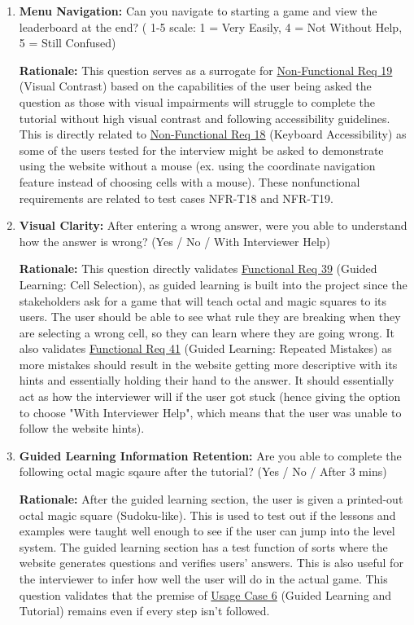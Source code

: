 \documentclass[12pt, titlepage]{article}
\begin{document}
\begin{enumerate}
    \item \textbf{Menu Navigation:} Can you navigate to starting a game and view the leaderboard at the end? ( 1-5 scale: 1 = Very Easily, 4 = Not Without Help, 5 = Still Confused)
    
    \textbf{Rationale:} This question serves as a surrogate for
    \hyperref[NFR_19]{Non-Functional Req  19} (Visual Contrast) based on the capabilities of the user being asked the question as those with visual impairments will struggle to complete
    the tutorial without high visual contrast and following accessibility guidelines. This is directly related to \hyperref[NFR_18]{Non-Functional Req  18} (Keyboard Accessibility) 
    as some of the users tested for the interview might be asked to demonstrate using the website without a mouse (ex. using the coordinate navigation feature instead of choosing cells with a mouse).
    These nonfunctional requirements are related to test cases NFR-T18 and NFR-T19. 
    
    \item \textbf{Visual Clarity:} After entering a wrong answer, were you able to understand how the answer is wrong? (Yes / No / With Interviewer Help)
    
    \textbf{Rationale:} This question directly validates \hyperref[FR_39]{Functional Req 39} (Guided Learning: Cell Selection), as guided learning is built into the project since the stakeholders ask
    for a game that will teach octal and magic squares to its users. The user should be able to see what rule they are breaking when they are selecting a wrong cell, so they can learn where they are 
    going wrong. It also validates \hyperref[FR_41]{Functional Req 41} (Guided Learning: Repeated Mistakes) as more mistakes should result in the website getting more descriptive with its hints and essentially 
    holding their hand to the answer. It should essentially act as how the interviewer will if the user got stuck (hence giving the option to choose "With Interviewer Help", which means that the user was unable to follow the website hints).
    
    \item \textbf{Guided Learning Information Retention:} Are you able to complete the following octal magic sqaure after the tutorial? (Yes / No / After 3 mins)
    
    \textbf{Rationale:} After the guided learning section, the user is given a printed-out octal magic square (Sudoku-like). This is used to test out if the lessons and examples were taught well enough to 
    see if the user can jump into the level system. The guided learning section has a test function of sorts where the website generates questions and verifies users' answers. This is also useful for the interviewer to infer 
    how well the user will do in the actual game. This question validates that the premise of \hyperref[UC-6]{Usage Case 6} (Guided Learning and Tutorial) remains even if every step isn't followed.
    

\end{enumerate}
\end{document}
